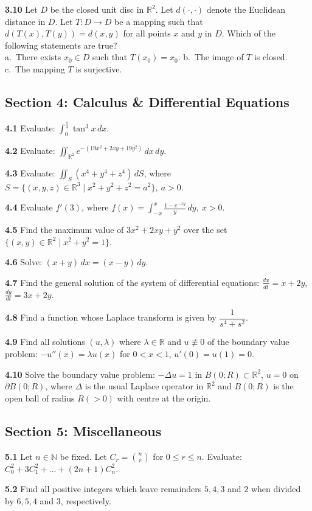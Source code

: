\documentclass[11pt,a4paper]{article}
\newcommand{\N}{\mathbb{N}}
\newcommand{\R}{\mathbb{R}}
\newcommand{\examsec}[1]{%
  \subsection*{#1}
  \vspace{-2pt}
}
\newcommand{\qitem}[1]{\par\medskip\noindent\textbf{#1}\hspace{0.5em}}
\begin{document}
\qitem{3.10} Let $D$ be the closed unit disc in $\R^2$. Let $d(\cdot, \cdot)$ denote the Euclidean distance in $D$. Let $T : D \to D$ be a mapping such that $d(T(x), T(y)) = d(x, y)$ for all points $x$ and $y$ in $D$. Which of the following statements are true?\\
a.\ There exists $x_0 \in D$ such that $T(x_0) = x_0$. \qquad b.\ The image of $T$ is closed. \qquad c.\ The mapping $T$ is surjective.

\examsec{Section 4: Calculus \& Differential Equations}

\qitem{4.1} Evaluate: $\displaystyle\int_0^{\frac{\pi}{4}} \tan^3 x\,dx$.

\qitem{4.2} Evaluate: $\displaystyle\iint_{\R^2} e^{-(19x^2 + 2xy + 19y^2)}\,dx\,dy$.

\qitem{4.3} Evaluate: $\displaystyle\iint_S (x^4 + y^4 + z^4)\,dS$, where $S = \{(x, y, z) \in \R^3 \mid x^2 + y^2 + z^2 = a^2\},\ a > 0$.

\qitem{4.4} Evaluate $f'(3)$, where $f(x) = \displaystyle\int_{-x}^{x} \frac{1 - e^{-xy}}{y}\,dy,\ x > 0$.

\qitem{4.5} Find the maximum value of $3x^2 + 2xy + y^2$ over the set $\{(x, y) \in \R^2 \mid x^2 + y^2 = 1\}$.

\qitem{4.6} Solve: $(x + y)\,dx = (x - y)\,dy$.

\qitem{4.7} Find the general solution of the system of differential equations: $\frac{dx}{dt} = x + 2y$, $\frac{dy}{dt} = 3x + 2y$.

\qitem{4.8} Find a function whose Laplace transform is given by $\dfrac{1}{s^4 + s^2}$.

\qitem{4.9} Find all solutions $(u, \lambda)$ where $\lambda \in \R$ and $u \not\equiv 0$ of the boundary value problem: $-u''(x) = \lambda u(x)$ for $0 < x < 1$, $u'(0) = u(1) = 0$.

\qitem{4.10} Solve the boundary value problem: $-\Delta u = 1$ in $B(0; R) \subset \R^2$, $u = 0$ on $\partial B(0; R)$, where $\Delta$ is the usual Laplace operator in $\R^2$ and $B(0; R)$ is the open ball of radius $R (> 0)$ with centre at the origin.

\examsec{Section 5: Miscellaneous}

\qitem{5.1} Let $n \in \N$ be fixed. Let $C_r = \binom{n}{r}$ for $0 \le r \le n$. Evaluate: $C_0^2 + 3C_1^2 + \dots + (2n + 1)C_n^2$.

\qitem{5.2} Find all positive integers which leave remainders $5, 4, 3$ and $2$ when divided by $6, 5, 4$ and $3$, respectively.
\end{document}
